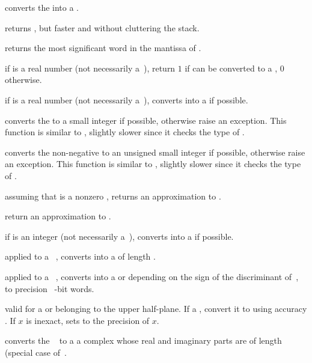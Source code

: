  converts the   into a
.

 returns , but
faster and without cluttering the stack.

 returns the most significant word
in the mantissa of .

 if  is a real number (not necessarily
a~), return $1$ if  can be converted to a ,
$0$ otherwise.

 if  is a real number (not necessarily
a~), converts  into a  if possible.

 converts the   to a small
integer if possible, otherwise raise an exception. This function
is similar to , slightly slower since it checks the type of .

 converts the non-negative   to
an unsigned small integer if possible, otherwise raise an exception. This
function is similar to , slightly slower since it checks the type
of .

 assuming that  is a nonzero ,
returns an approximation to .

 return an approximation to .

 if  is an integer (not necessarily
a~), converts  into a  if possible.

 applied to a ~, converts
 into a  of length .

 applied to a ~, converts
 into a  or  depending on the sign of the
discriminant of~, to precision \hbox{ \B-bit} words.

 valid for a 
or  belonging to the upper half-plane. If a , convert it
to  using accuracy . If $x$ is inexact, sets
 to the precision of $x$.

 converts the ~ to a
a complex whose real and imaginary parts are  of length 
(special case of~.

